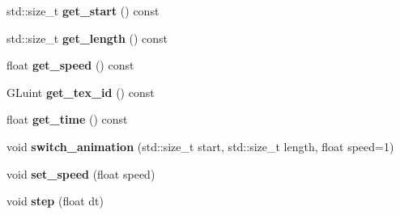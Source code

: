 \begin{DoxyCompactItemize}
\item 
\mbox{\label{classnta_1_1Animation2D_a27647ebb0767d114b3330d784be76659}} 
std\+::size\+\_\+t {\bfseries get\+\_\+start} () const
\item 
\mbox{\label{classnta_1_1Animation2D_a879e528e64c38508ecab2dfff935d5d9}} 
std\+::size\+\_\+t {\bfseries get\+\_\+length} () const
\item 
\mbox{\label{classnta_1_1Animation2D_ac9848d72d81b4391bffc40473bb6556e}} 
float {\bfseries get\+\_\+speed} () const
\item 
\mbox{\label{classnta_1_1Animation2D_a0ad6c0188e2b36f42caf1817537ec483}} 
G\+Luint {\bfseries get\+\_\+tex\+\_\+id} () const
\item 
\mbox{\label{classnta_1_1Animation2D_aa0aae6f2c69f9edb1e5f0dc35a440e48}} 
float {\bfseries get\+\_\+time} () const
\item 
\mbox{\label{classnta_1_1Animation2D_aa5de467f16ecc3851bcfbf1da68a6103}} 
void {\bfseries switch\+\_\+animation} (std\+::size\+\_\+t start, std\+::size\+\_\+t length, float speed=1)
\item 
\mbox{\label{classnta_1_1Animation2D_ab22616e5abdf38980404a711503f1b99}} 
void {\bfseries set\+\_\+speed} (float speed)
\item 
\mbox{\label{classnta_1_1Animation2D_a3bc6f94232a04f3302ab5670ab46be44}} 
void {\bfseries step} (float dt)
\end{DoxyCompactItemize}
